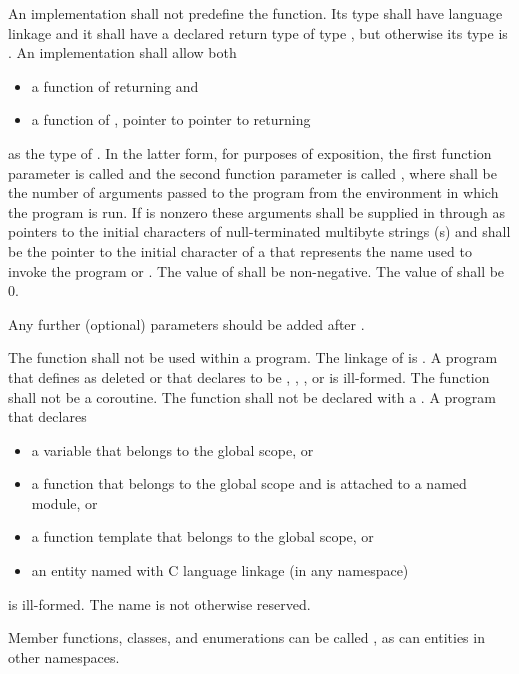 \pnum
An implementation shall not predefine the  function.
Its type shall have \Cpp{} language linkage
and it shall have a declared return type of type
, but otherwise its type is .
%
An implementation shall allow both
\begin{itemize}
\item a function of \tcode{()} returning  and
\item a function of , pointer to pointer to  returning 
\end{itemize}
%
%
as the type of .
%
%
In the latter form, for purposes of exposition, the first function
parameter is called  and the second function parameter is
called , where  shall be the number of
arguments passed to the program from the environment in which the
program is run. If
 is nonzero these arguments shall be supplied in
 through  as pointers to the initial
characters of null-terminated multibyte strings (\ntmbs{}s)
and  shall be the pointer to
the initial character of a \ntmbs{} that represents the name used to
invoke the program or . The value of  shall be
non-negative. The value of  shall be 0.

\recommended
Any further (optional) parameters should be added after .

\pnum
The function  shall not be used within
a program.
%
The linkage of  is
. A program that defines  as
deleted or that declares  to be
, , , or  is ill-formed.
The function  shall not be a coroutine.
The  function shall not be declared with a
.
A program that declares
\begin{itemize}
\item
a variable  that belongs to the global scope, or
\item
a function  that belongs to the global scope and
is attached to a named module, or
\item
a function template  that belongs to the global scope, or
\item
an entity named 
with C language linkage (in any namespace)
\end{itemize}
is ill-formed.
The name  is
not otherwise reserved.
\begin{example}
Member functions, classes, and
enumerations can be called , as can entities in other
namespaces.
\end{example}

